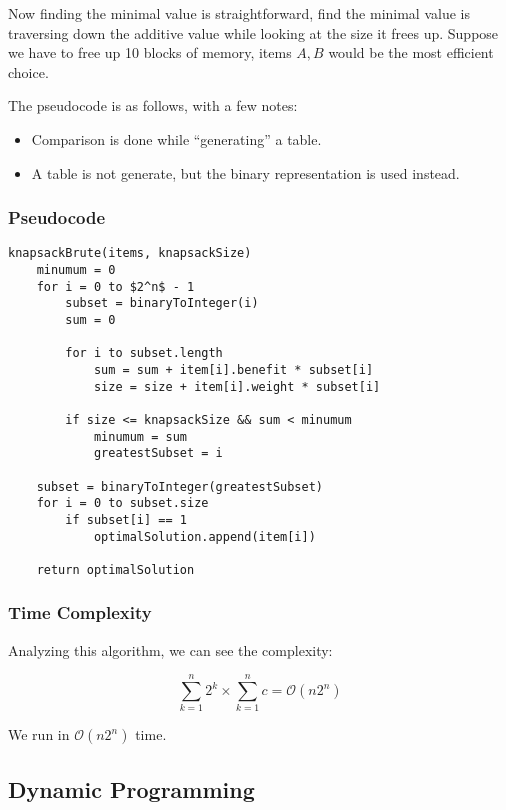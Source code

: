 \documentclass{article}
\begin{document}
Now finding the minimal value is straightforward, find the minimal value is traversing down the additive value while looking at the size it frees up. Suppose we have to free up 10 blocks of memory, items $A, B$ would be the most efficient choice.

The pseudocode is as follows, with a few notes:

\begin{itemize}
    \item Comparison is done while ``generating'' a table.
    \item A table is not generate, but the binary representation is used instead.
\end{itemize}

\subsubsection{Pseudocode}
\begin{lstlisting}[mathescape]
knapsackBrute(items, knapsackSize)
    minumum = 0
    for i = 0 to $2^n$ - 1
        subset = binaryToInteger(i)
        sum = 0

        for i to subset.length
            sum = sum + item[i].benefit * subset[i]
            size = size + item[i].weight * subset[i]

        if size <= knapsackSize && sum < minumum
            minumum = sum
            greatestSubset = i

    subset = binaryToInteger(greatestSubset)
    for i = 0 to subset.size
        if subset[i] == 1
            optimalSolution.append(item[i])

    return optimalSolution
\end{lstlisting}

\subsubsection{Time Complexity}
Analyzing this algorithm, we can see the complexity:

\begin{equation}
    \sum _{k = 1} ^{n} 2^k \times \sum _{k = 1} ^{n} c = \mathcal{O}(n 2^n)
\end{equation}

We run in $\mathcal{O}(n 2^n)$ time.

\subsection{Dynamic Programming}
\end{document}
